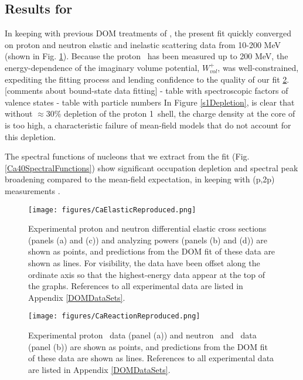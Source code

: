\subsection{Results for \caForty}
In keeping with previous DOM treatments of \caForty \cite{MahzoonPhDThesis}, the present fit
quickly converged on proton and neutron elastic and inelastic scattering data from 10-200
MeV (shown in Fig. \ref{CaElasticReproduced}). Because the \caForty proton \rxn\ has been
measured up to 200 MeV, the energy-dependence of the imaginary volume potential, $W_{vol}^{+}$, was
well-constrained, expediting the fitting process and lending confidence to the quality of our fit
\ref{CaReactionReproduced}. 
[comments about bound-state data fitting]
- table with spectroscopic factors of valence states
- table with particle numbers
In Figure \ref{s1Depletion}, is clear that without $\approx$30\%
depletion of the proton 1\sOne\ shell, the charge density at the core of
\caForty is too high,
a characteristic failure of mean-field models that do not account for this depletion. 

The spectral functions of \caForty nucleons that 
we extract from the fit (Fig. \ref{Ca40SpectralFunctions}) show significant occupation depletion and 
spectral peak broadening compared 
to the mean-field expectation, in keeping with (p,2p) measurements \cite{LiverpoolCa40}.

\begin{figure}[ht!]
    \centering
    \texttt{[image: figures/CaElasticReproduced.png]}
    \caption[Nucleon differential cross sections of \caForty: DOM predictions and experimental data]
    {
        Experimental \caForty proton and neutron differential elastic cross sections
        (panels (a) and (c)) and analyzing powers (panels (b) and (d)) are shown as points, and 
        predictions from the DOM \caForty fit of these data are shown as lines. For visibility, the 
        data have been offset along the ordinate axis so that the highest-energy data
        appear at the top of the graphs. References to all experimental data are listed
        in Appendix \ref{DOMDataSets}.
    }
    \label{CaElasticReproduced}
\end{figure}

\begin{figure}[ht!]
    \centering
    \texttt{[image: figures/CaReactionReproduced.png]}
    \caption[Nucleon \rxn\ of \caForty: DOM predictions and experimental data]
    {
        Experimental \caForty proton \rxn\ data (panel (a)) and neutron \tot\ and \rxn\ data (panel
        (b)) are shown as points, and 
        predictions from the DOM \caForty fit of these data are shown as lines.
        References to all experimental data are listed in Appendix \ref{DOMDataSets}.
    }
    \label{CaReactionReproduced}
\end{figure}

